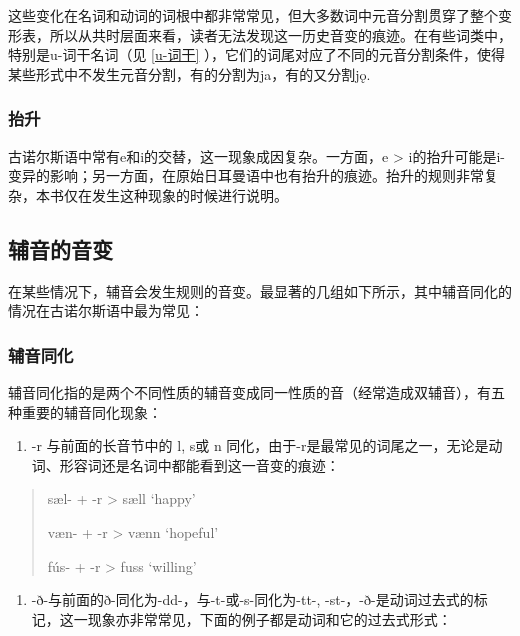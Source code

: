    这些变化在名词和动词的词根中都非常常见，但大多数词中元音分割贯穿了整个变形表，所以从共时层面来看，读者无法发现这一历史音变的痕迹。在有些词类中，特别是u-词干名词（见 \ref{u-词干} ），它们的词尾对应了不同的元音分割条件，使得某些形式中不发生元音分割，有的分割为ja，有的又分割jǫ.

    \subsubsection{抬升}
    \label{抬升}

    古诺尔斯语中常有e和i的交替，这一现象成因复杂。一方面，e \textgreater{} i的抬升可能是i-变异的影响；另一方面，在原始日耳曼语中也有抬升的痕迹。抬升的规则非常复杂，本书仅在发生这种现象的时候进行说明。

\subsection{辅音的音变}
\label{辅音的音变}

在某些情况下，辅音会发生规则的音变。最显著的几组如下所示，其中辅音同化的情况在古诺尔斯语中最为常见：

\subsubsection{辅音同化}
\label{辅音同化}

辅音同化指的是两个不同性质的辅音变成同一性质的音（经常造成双辅音），有五种重要的辅音同化现象：

\begin{enumerate}
    \def\labelenumi{(\alph{enumi})}
    \item
          \label{_Ref117517668}{}-r 与前面的长音节中的 l, s或 n
          同化，由于-r是最常见的词尾之一，无论是动词、形容词还是名词中都能看到这一音变的痕迹：
  \end{enumerate}
  
  \begin{quote}
    sæl- + -r \textgreater{} sæll `happy'
  
    væn- + -r \textgreater{} vænn `hopeful'
  
    fús- + -r \textgreater{} fuss `willing'
  \end{quote}
  
  \begin{enumerate}
    \def\labelenumi{(\alph{enumi})}
    \setcounter{enumi}{1}
    \item
          -ð-与前面的ð-同化为-dd-，与-t-或-s-同化为-tt-,
          -st-，-ð-是动词过去式的标记，这一现象亦非常常见，下面的例子都是动词和它的过去式形式：
  \end{enumerate}
  
